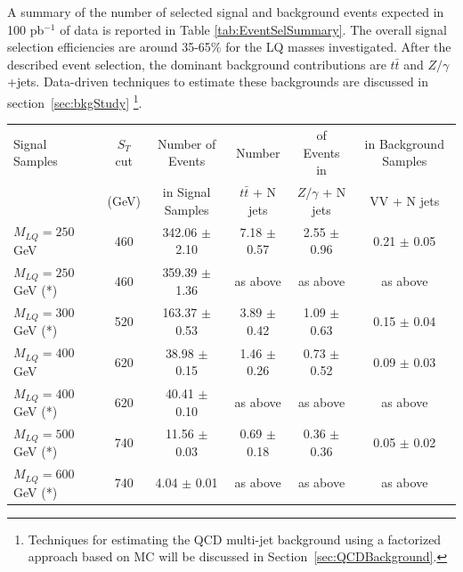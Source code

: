 A summary of the number of selected signal and background events expected in 100 pb$^{-1}$ of data 
is reported in Table \ref{tab:EventSelSummary}. 
The overall signal selection efficiencies are around 35-65\% for the LQ masses investigated. 
After the described event selection, the dominant background contributions 
are $t\bar{t}$ and $Z/\gamma$+jets. Data-driven techniques to estimate these backgrounds
are discussed in section~\ref{sec:bkgStudy} \footnote{Techniques for estimating the QCD multi-jet background using 
a factorized approach based on MC will be discussed in Section~\ref{sec:QCDBackground}.}.

\begin{table}[htbp]
\begin{center}
\begin{tabular}{|lcc||ccc|}
\hline\hline
Signal Samples       & $S_T$ cut       & Number of Events     & Number              & of Events in        & in Background Samples     \\
                     & (GeV)           & in Signal Samples    & $t\bar{t}$ + N jets & $Z/\gamma$ + N jets & VV + N jets               \\ 
\hline
$M_{LQ}=250~$GeV     & 460             & 342.06 $\pm$ 2.10    & 7.18  $\pm$ 0.57    & 2.55  $\pm$ 0.96    & 0.21 $\pm$ 0.05 \\ 
$M_{LQ}=250~$GeV (*) & 460             & 359.39 $\pm$ 1.36    & as above            & as above            & as above        \\
$M_{LQ}=300~$GeV (*) & 520             & 163.37 $\pm$ 0.53    & 3.89  $\pm$ 0.42    & 1.09  $\pm$ 0.63    & 0.15 $\pm$ 0.04 \\ 
$M_{LQ}=400~$GeV     & 620             &  38.98 $\pm$ 0.15    & 1.46  $\pm$ 0.26    & 0.73  $\pm$ 0.52    & 0.09 $\pm$ 0.03 \\ 
$M_{LQ}=400~$GeV (*) & 620             &  40.41 $\pm$ 0.10    & as above            & as above            & as above        \\
$M_{LQ}=500~$GeV (*) & 740             &  11.56 $\pm$ 0.03    & 0.69  $\pm$ 0.18    & 0.36  $\pm$ 0.36    & 0.05 $\pm$ 0.02 \\ 
$M_{LQ}=600~$GeV (*) & 740             &   4.04 $\pm$ 0.01    & as above            & as above            & as above        \\

\end{tabular}
\end{center}
\end{table}

